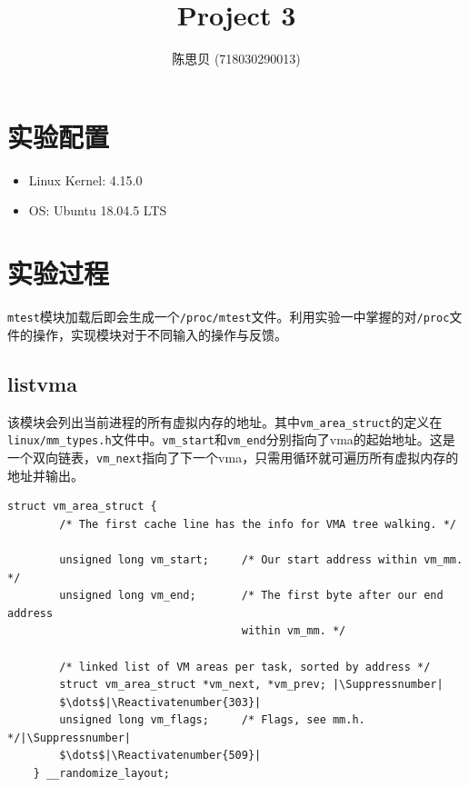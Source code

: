 \documentclass[UTF8]{ctexrep}
\title{
    \horrule{0.5pt} \\[0.4cm]
    \huge Project 3 \\
    \horrule{2pt}
}
\author{
    陈思贝 (718030290013)
}
\date{
}
\makeatletter
\let\origthelstnumber\thelstnumber
\newcommand*\Suppressnumber{%
  \lst@AddToHook{OnNewLine}{%
    \let\thelstnumber\relax%
     \advance\c@lstnumber-\@ne\relax%
    }%
}
\newcommand*\Reactivatenumber[1]{%
  \setcounter{lstnumber}{\numexpr#1-1\relax}
  \lst@AddToHook{OnNewLine}{%
   \let\thelstnumber\origthelstnumber%
   \refstepcounter{lstnumber}
  }%
}
\makeatother
\begin{document}
    \maketitle

    \section{实验配置}

    \begin{itemize}
        \item Linux Kernel: 4.15.0
        \item OS: Ubuntu 18.04.5 LTS
    \end{itemize}
    \vspace{.3cm}

    \section{实验过程}
    
    \texttt{mtest}模块加载后即会生成一个\texttt{/proc/mtest}文件。利用实验一中掌握的对\texttt{/proc}文件的操作，实现模块对于不同输入的操作与反馈。\\

    \subsection{listvma}

    该模块会列出当前进程的所有虚拟内存的地址。其中\texttt{vm\_area\_struct}的定义在\texttt{linux/mm\_types.h}文件中。\texttt{vm\_start}和\texttt{vm\_end}分别指向了vma的起始地址。这是一个双向链表，\texttt{vm\_next}指向了下一个vma，只需用循环就可遍历所有虚拟内存的地址并输出。

    \begin{lstlisting}[firstnumber=280]
    struct vm_area_struct {
        /* The first cache line has the info for VMA tree walking. */

        unsigned long vm_start;		/* Our start address within vm_mm. */
        unsigned long vm_end;		/* The first byte after our end address
                                    within vm_mm. */

        /* linked list of VM areas per task, sorted by address */
        struct vm_area_struct *vm_next, *vm_prev; |\Suppressnumber|
        $\dots$|\Reactivatenumber{303}|
        unsigned long vm_flags;		/* Flags, see mm.h. */|\Suppressnumber|
        $\dots$|\Reactivatenumber{509}|
    } __randomize_layout;
    \end{lstlisting}
\end{document}
